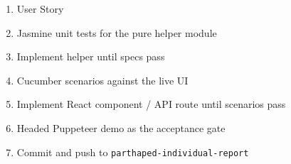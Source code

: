 \documentclass[11pt]{article}
\begin{document}
\begin{enumerate}[leftmargin=*]
  \item User Story
  \item Jasmine unit tests for the pure helper module
  \item Implement helper until specs pass
  \item Cucumber scenarios against the live UI
  \item Implement React component / API route until scenarios pass
  \item Headed Puppeteer demo as the acceptance gate
  \item Commit and push to \texttt{parthaped-individual-report}
\end{enumerate}
\end{document}
